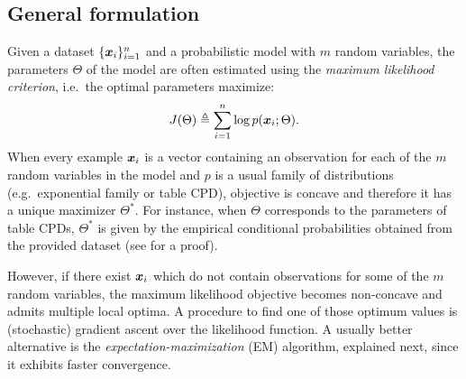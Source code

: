 \subsection{General formulation}
\label{sec:general_em}
Given a dataset $\lbrace {\bm{x}}_i \rbrace_{i=1}^n$ and a probabilistic model with $m$ random variables, the parameters $\Theta$ of the model are often estimated using the \emph{maximum likelihood criterion}, i.e.\ the optimal parameters maximize:
\begin{equation}
    \label{eq:maximum_likelihood}
    J(\Theta) \triangleq \sum_{i=1}^n \log p({\bm{x}}_i; \Theta).
\end{equation}
When every example ${\bm{x}}_i$ is a vector containing an observation for each of the $m$ random variables in the model and $p$ is a usual family of distributions (e.g.\ exponential family or table CPD), objective  is concave and therefore it has a unique maximizer $\Theta^*$. For instance, when $\Theta$ corresponds to the parameters of table CPDs, $\Theta^*$ is given by the empirical conditional probabilities obtained from the provided dataset (see \citet{Koller2009} for a proof).

However, if there exist ${\bm{x}}_i$ which do not contain observations for some of the $m$ random variables, the maximum likelihood objective becomes non-concave and admits multiple local optima. A procedure to find one of those optimum values is (stochastic) gradient ascent over the likelihood function. A usually better alternative is the \emph{expectation-maximization} (EM) algorithm, explained next, since it exhibits faster convergence.

